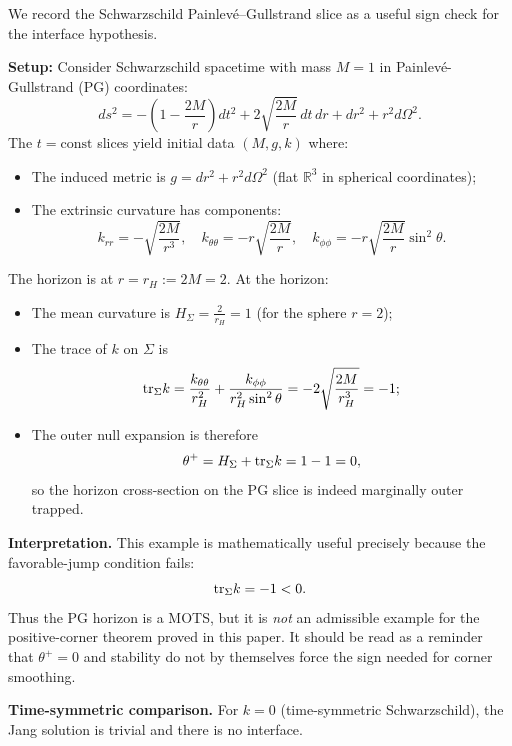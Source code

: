 \begin{remark}\label{rem:NumericalVerificationSchPG}
We record the Schwarzschild Painlev\'e--Gullstrand slice as a useful sign check for the interface hypothesis.

\textbf{Setup:} Consider Schwarzschild spacetime with mass $M = 1$ in Painlev\'e-Gullstrand (PG) coordinates:
\[
    ds^2 = -\left(1 - \frac{2M}{r}\right)dt^2 + 2\sqrt{\frac{2M}{r}}\, dt\, dr + dr^2 + r^2 d\Omega^2.
\]
The $t = \text{const}$ slices yield initial data $(M, g, k)$ where:
\begin{itemize}
    \item The induced metric is $g = dr^2 + r^2 d\Omega^2$ (flat $\mathbb{R}^3$ in spherical coordinates);
    \item The extrinsic curvature has components:
    \[
        k_{rr} = -\sqrt{\frac{2M}{r^3}}, \quad k_{\theta\theta} = -r\sqrt{\frac{2M}{r}}, \quad k_{\phi\phi} = -r\sqrt{\frac{2M}{r}}\sin^2\theta.
    \]
\end{itemize}
The horizon is at $r = r_H := 2M = 2$. At the horizon:
\begin{itemize}
    \item The mean curvature is $H_\Sigma = \frac{2}{r_H} = 1$ (for the sphere $r = 2$);
    \item The trace of $k$ on $\Sigma$ is
    \[
        \mathrm{tr}_\Sigma k = \frac{k_{\theta\theta}}{r_H^2} + \frac{k_{\phi\phi}}{r_H^2\sin^2\theta} = -2\sqrt{\frac{2M}{r_H^3}} = -1;
    \]
    \item The outer null expansion is therefore
    \[
        \theta^+ = H_\Sigma + \mathrm{tr}_\Sigma k = 1 - 1 = 0,
    \]
    so the horizon cross-section on the PG slice is indeed marginally outer trapped.
\end{itemize}

\textbf{Interpretation.} This example is mathematically useful precisely because the favorable-jump condition fails:
\[
    \mathrm{tr}_\Sigma k=-1<0.
\]
Thus the PG horizon is a MOTS, but it is \emph{not} an admissible example for the positive-corner theorem proved in this paper. It should be read as a reminder that $\theta^+=0$ and stability do not by themselves force the sign needed for corner smoothing.

\textbf{Time-symmetric comparison.} For $k=0$ (time-symmetric Schwarzschild), the Jang solution is trivial and there is no interface.


\end{remark}
